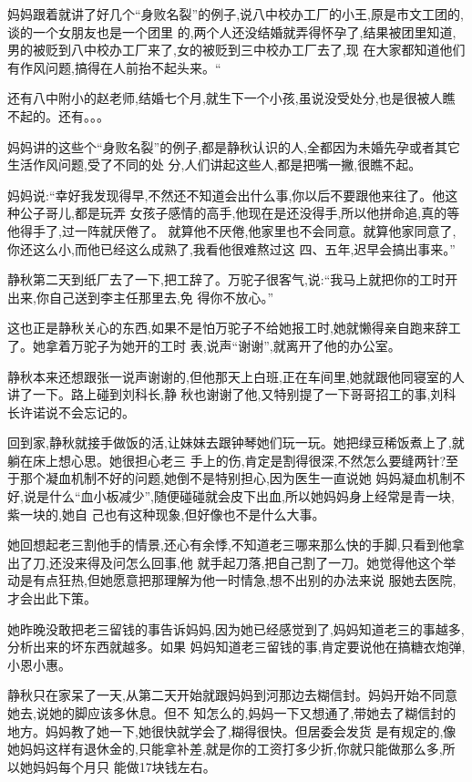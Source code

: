 ﻿\documentclass[12pt]{article}
\begin{document}
妈妈跟着就讲了好几个``身败名裂''的例子,说八中校办工厂的小王,原是市文工团的,谈的一个女朋友也是一个团里
的,两个人还没结婚就弄得怀孕了,结果被团里知道,男的被贬到八中校办工厂来了,女的被贬到三中校办工厂去了,现
在大家都知道他们有作风问题,搞得在人前抬不起头来。``

还有八中附小的赵老师,结婚七个月,就生下一个小孩,虽说没受处分,也是很被人瞧不起的。还有。。。

妈妈讲的这些个``身败名裂''的例子,都是静秋认识的人,全都因为未婚先孕或者其它生活作风问题,受了不同的处
分,人们讲起这些人,都是把嘴一撇,很瞧不起。

妈妈说:``幸好我发现得早,不然\myrule 还不知道会出什么事,你以后不要跟他来往了。他这种公子哥儿,都是玩弄
女孩子\myrule 感情的\myrule 高手,他现在是还没\myrule 得手,所以他拼命追,真的等他得手了,过一阵就厌倦了。
就算他不厌倦,他家里也不会同意。就算他家同意了,你还这么小,而他已经\myrule 这么成熟了,我看他很难熬过这
四、五年,迟早会搞出事来。''

静秋第二天到纸厂去了一下,把工辞了。万驼子很客气,说:``我马上就把你的工时开出来,你自己送到李主任那里去,免
得你不放心。''

这也正是静秋关心的东西,如果不是怕万驼子不给她报工时,她就懒得亲自跑来辞工了。她拿着万驼子为她开的工时
表,说声``谢谢'',就离开了他的办公室。


静秋本来还想跟张一说声谢谢的,但他那天上白班,正在车间里,她就跟他同寝室的人讲了一下。路上碰到刘科长,静
秋也谢谢了他,又特别提了一下哥哥招工的事,刘科长许诺说不会忘记的。

回到家,静秋就接手做饭的活,让妹妹去跟钟琴她们玩一玩。她把绿豆稀饭煮上了,就躺在床上想心思。她很担心老三
手上的伤,肯定是割得很深,不然怎么要缝两针?至于那个凝血机制不好的问题,她倒不是特别担心,因为医生一直说她
妈妈凝血机制不好,说是什么``血小板减少'',随便碰碰就会皮下出血,所以她妈妈身上经常是青一块,紫一块的,她自
己也有这种现象,但好像也不是什么大事。

她回想起老三割他手的情景,还心有余悸,不知道老三哪来那么快的手脚,只看到他拿出了刀,还没来得及问怎么回事,他
就手起刀落,把自己割了一刀。她觉得他这个举动是有点狂热,但她愿意把那理解为他一时情急,想不出别的办法来说
服她去医院,才会出此下策。

她昨晚没敢把老三留钱的事告诉妈妈,因为她已经感觉到了,妈妈知道老三的事越多,分析出来的坏东西就越多。如果
妈妈知道老三留钱的事,肯定要说他在搞糖衣炮弹,小恩小惠。

静秋只在家呆了一天,从第二天开始就跟妈妈到河那边去糊信封。妈妈开始不同意她去,说她的脚应该多休息。但不
知怎么的,妈妈一下又想通了,带她去了糊信封的地方。妈妈教了她一下,她很快就学会了,糊得很快。但居委会发货
是有规定的,像她妈妈这样有退休金的,只能拿补差,就是你的工资打多少折,你就只能做那么多,所以她妈妈每个月只
能做17块钱左右。
\end{document}
